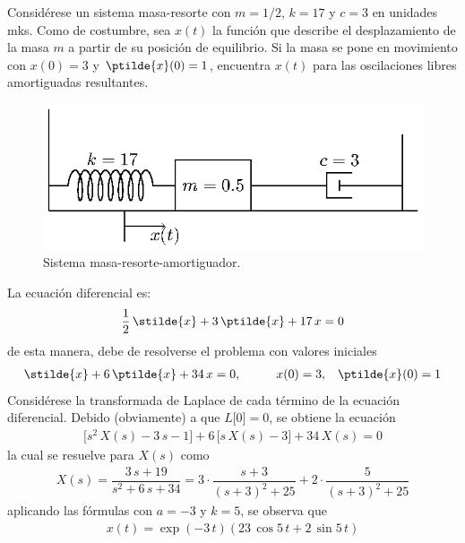 \begin{ejemplo}
Considérese un sistema masa-resorte con $m = 1/2$, $k = 17$ y $c = 3$ en unidades mks. Como de costumbre, sea $x(t)$ la función que describe el desplazamiento de la masa $m$ a partir de su posición de equilibrio. Si la masa se pone en movimiento con $x(0)= 3$ y $\ptilde{x}(0) = 1$, encuentra $x(t)$ para las oscilaciones libres amortiguadas resultantes.
\begin{figure}[H]
    \centering
    \includegraphics[scale=1.3]{Imagenes/sist_masa_resorte_dump_02.eps}
    \caption{Sistema masa-resorte-amortiguador.}
    \label{fig:figura_008}    
\end{figure}
La ecuación diferencial es:
\begin{align*}
\dfrac{1}{2} \, \stilde{x} + 3 \, \ptilde{x} + 17 \, x = 0
\end{align*}
de esta manera, debe de resolverse el problema con valores iniciales
\begin{align*}
\stilde{x} + 6 \, \ptilde{x} + 34 \, x = 0, \hspace{1cm} x(0) = 3, \hspace{0.3cm} \ptilde{x} (0) = 1
\end{align*}
Considérese la transformada de Laplace de cada término de la ecuación diferencial. Debido (obviamente) a que $L \big[0\big] = 0$, se obtiene la ecuación
\begin{align*}
\big[ s^{2} \, X(s) - 3 \, s - 1 \big] + 6 \, [s \, X(s) - 3 \big] + 34 \, X(s) = 0
\end{align*}
la cual se resuelve para $X(s)$ como 
\begin{align*}
X(s) = \dfrac{3 \, s + 19}{s^{2} + 6\, s + 34} =  3 \cdot \dfrac{s + 3}{(s + 3)^{2} + 25} + 2 \cdot \dfrac{5}{(s + 3)^{2} + 25}
\end{align*}
aplicando las fórmulas con $a = -3$ y $k = 5$, se observa que
\begin{align*}
x(t) = \exp(-3 \, t)(23 \, \cos 5 \, t + 2 \, \sin 5\, t)
\end{align*}

\end{ejemplo}
